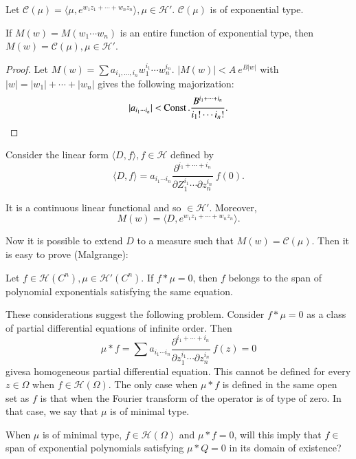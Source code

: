 Let $\mathscr{C}(\mu) = \langle \mu, e^{w_1z_1 + \cdots +
 w_nz_n}\rangle, \mu \in \mathscr{H}'$. $\mathscr{C}(\mu)$ is of
exponential type. 

\begin{theorem*}  
  If $M(w) = M(w_1 \cdots w_n)$ is an entire
  function of exponential type, then $M(w) = \mathscr{C}(\mu), \mu \in
  \mathscr{H}'$. 
\end{theorem*}

\begin{proof}%
 Let $M(w) = \sum a_{i_1, \ldots, i_n} w^{i_1}_1 \cdots
 w_n^{i_n}$. $|M(w)| < A ~ e^{B|w|}$ with $|w| = |w_1| + \cdots + |
 w_n |$ gives the following majorization: 
 $$
 | a_{i_1 \cdots i_n} | < \operatorname{Const}. \frac{B^{i_1 + \cdots +
  i_n}}{i_1 ! \cdots i_n !}. 
 $$
\end{proof}

Consider the linear form $\langle D,f \rangle, f \in\mathscr{H}$ defined by 
$$
\langle D, f \rangle = a_{i_1 \cdots i_n} \frac{\partial^{i_1 + \cdots
 + i_n}}{\partial Z^{i_1}_1 \cdots \partial z^{i_n}_{n}} ~ f(0). 
$$

It is a continuous linear functional and so $\in \mathscr{H}'$. Moreover,
$$
M(w) = \langle D, e^{w_1 z_1 + \cdots + w_nz_n } \rangle.
$$

Now it is possible to extend $D$ to a measure such that $M(w) =
\mathscr{C}(\mu)$. Then it is easy to prove (Malgrange): 
\begin{theorem*}%
 Let $f \in \mathscr{H}(C^n), \mu \in \mathscr{H}'(C^n)$. If $f * \mu
 = 0$, then $f$ belongs to the span of polynomial exponentials
 satisfying the same equation. 
\end{theorem*}

These considerations suggest the following problem. Consider $f * \mu
= 0$ as a class of partial differential equations of infinite
order. Then 
$$
\mu * f = \sum a_{i_1 \cdots i_n} \frac{\partial^{i_1 + \cdots +
 i_n}}{\partial z^{i_1}_1 \cdots \partial z^{i_n}_n} ~ f(z) = 0 
$$
gives\pageoriginale a homogeneous partial differential equation. This cannot be
defined for every $z \in \Omega$ when $f \in \mathscr{H}(\Omega)$. The
only case when $\mu * f$ is defined in the same open set as $f$ is
that when the Fourier transform of the operator is of type of zero. In
that case, we say that $\mu$ is of minimal type. 

\begin{prob}\label{chap24:prob2}%
 When $\mu$ is of minimal type, $f \in \mathscr{H} (\Omega)$ and $\mu
 * f = 0$, will this imply that $f \in $ span of exponential
 polynomials satisfying $\mu * Q = 0$ in its domain of existence? 
\end{prob}

